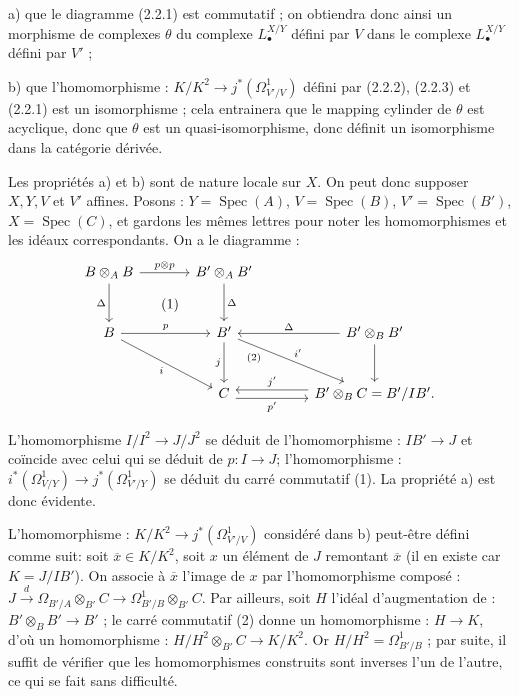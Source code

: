 \documentclass[11pt]{article}
\DeclareMathOperator{\Spec}{Spec}
\begin{document}
a) que le diagramme (2.2.1) est commutatif ; on obtiendra donc ainsi un morphisme de complexes $\theta$ du complexe $L^{X/Y}_\bullet$ défini par $V$ dans le complexe $L^{X/Y}_\bullet$ défini par $V'$ ;

b) que l'homomorphisme : $K/K^2\longrightarrow j^*(\Omega^1_{V'/V})$ défini par (2.2.2), (2.2.3) et (2.2.1) est un isomorphisme ; cela entrainera que le mapping cylinder de $\theta$ est acyclique, donc que $\theta$ est un quasi-isomorphisme, donc définit un isomorphisme dans la catégorie dérivée.

Les propriétés a) et b) sont de nature locale sur $X$. On peut donc supposer $X,Y,V$ et $V'$ affines. Posons : $Y=\Spec(A)$, $V=\Spec(B)$, $V'=\Spec(B')$, $X=\Spec(C)$, et gardons les mêmes lettres pour noter les homomorphismes et les idéaux correspondants. On a le diagramme :
\[
\begin{tikzcd}[column sep=large,row sep=large]
B\otimes_A B \arrow[r,"p\otimes p"] \arrow[d,"\Delta"'] \arrow[dr,phantom,"(1)"] & B'\otimes_A B' \arrow[d,"\Delta"]\\
B \arrow[r,"p"] \arrow[dr,"i"'] & B' \arrow[d,"j"'] \arrow[dr,"i'","(2)"' near start] & B'\otimes_B B' \arrow[l,"\Delta"'] \arrow[d]\\
{} & C \arrow[r,shift right=.7ex,"p'"'] & B'\otimes_B C = B'/IB'. \arrow[l,shift right=.7ex,"j'"']
\end{tikzcd}
\]

L'homomorphisme $I/I^2\to J/J^2$ se déduit de l'homomorphisme : $IB'\to J$ et coïncide avec celui qui se déduit de $p:I\to J$; l'homomorphisme : $i^*(\Omega^1_{V/Y})\longrightarrow j^*(\Omega^1_{V'/Y})$ se déduit du carré commutatif (1). La propriété a) est donc évidente.

L'homomorphisme : $K/K^2\to j^*(\Omega^1_{V'/V})$ considéré dans b) peut-être défini comme suit: soit $\overline x\in K/K^2$, soit $x$ un élément de $J$ remontant $\overline x$ (il en existe car $K=J/IB'$). On associe à $\overline x$ l'image de $x$ par l'homomorphisme composé : $J\xrightarrow{d}\Omega_{B'/A}\otimes_{B'}C\longrightarrow\Omega^1_{B'/B}\otimes_{B'}C$. Par ailleurs, soit $H$ l'idéal d'augmentation de : $B'\otimes_B B'\longrightarrow B'$ ; le carré commutatif (2) donne un homomorphisme : $H\to K$, d'où un homomorphisme : $H/H^2\otimes_{B'}C\longrightarrow K/K^2$. Or $H/H^2=\Omega^1_{B'/B}$ ; par suite, il suffit de vérifier que les homomorphismes construits sont inverses l'un de l'autre, ce qui se fait sans difficulté.
\end{document}
